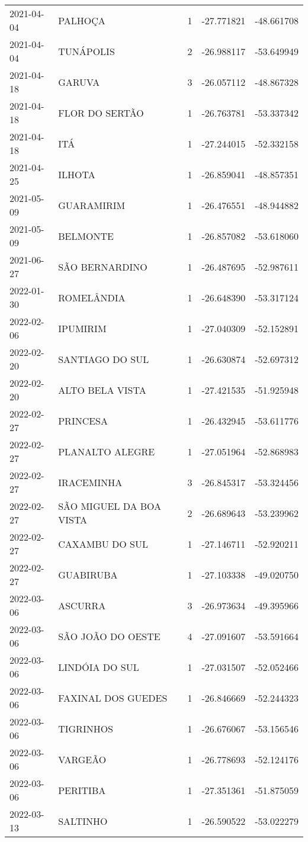 \documentclass[
	12pt,				%
	openright,			%
	oneside,			%
	a4paper,			%
	english,			%
	french,				%
	spanish,			%
	brazil				%
	dvipsnames, table]{abntex2}
\begin{document}
\begin{longtable}[htbp]{llcrr}
2021-04-04 & PALHOÇA & 1 & -27.771821 & -48.661708 \\
2021-04-04 & TUNÁPOLIS & 2 & -26.988117 & -53.649949 \\
2021-04-18 & GARUVA & 3 & -26.057112 & -48.867328 \\
2021-04-18 & FLOR DO SERTÃO & 1 & -26.763781 & -53.337342 \\
2021-04-18 & ITÁ & 1 & -27.244015 & -52.332158 \\
2021-04-25 & ILHOTA & 1 & -26.859041 & -48.857351 \\
2021-05-09 & GUARAMIRIM & 1 & -26.476551 & -48.944882 \\
2021-05-09 & BELMONTE & 1 & -26.857082 & -53.618060 \\
2021-06-27 & SÃO BERNARDINO & 1 & -26.487695 & -52.987611 \\
2022-01-30 & ROMELÂNDIA & 1 & -26.648390 & -53.317124 \\
2022-02-06 & IPUMIRIM & 1 & -27.040309 & -52.152891 \\
2022-02-20 & SANTIAGO DO SUL & 1 & -26.630874 & -52.697312 \\
2022-02-20 & ALTO BELA VISTA & 1 & -27.421535 & -51.925948 \\
2022-02-27 & PRINCESA & 1 & -26.432945 & -53.611776 \\
2022-02-27 & PLANALTO ALEGRE & 1 & -27.051964 & -52.868983 \\
2022-02-27 & IRACEMINHA & 3 & -26.845317 & -53.324456 \\
2022-02-27 & SÃO MIGUEL DA BOA VISTA & 2 & -26.689643 & -53.239962 \\
2022-02-27 & CAXAMBU DO SUL & 1 & -27.146711 & -52.920211 \\
2022-02-27 & GUABIRUBA & 1 & -27.103338 & -49.020750 \\
2022-03-06 & ASCURRA & 3 & -26.973634 & -49.395966 \\
2022-03-06 & SÃO JOÃO DO OESTE & 4 & -27.091607 & -53.591664 \\
2022-03-06 & LINDÓIA DO SUL & 1 & -27.031507 & -52.052466 \\
2022-03-06 & FAXINAL DOS GUEDES & 1 & -26.846669 & -52.244323 \\
2022-03-06 & TIGRINHOS & 1 & -26.676067 & -53.156546 \\
2022-03-06 & VARGEÃO & 1 & -26.778693 & -52.124176 \\
2022-03-06 & PERITIBA & 1 & -27.351361 & -51.875059 \\
2022-03-13 & SALTINHO & 1 & -26.590522 & -53.022279 \\

\end{longtable}
\end{document}
